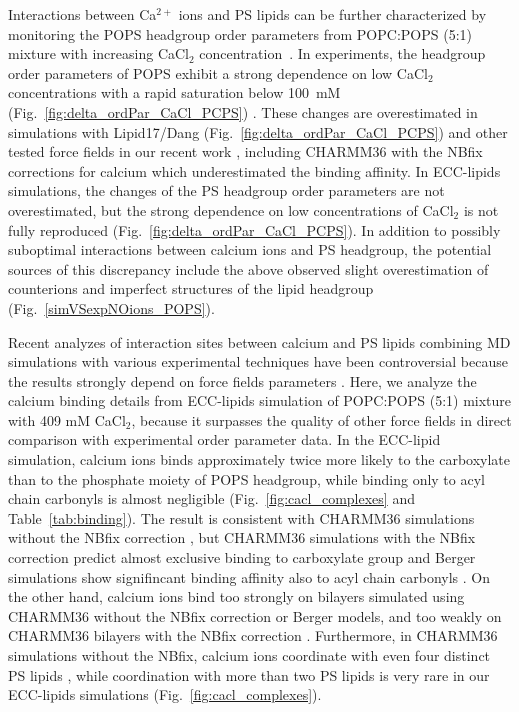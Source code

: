 \documentclass[journal=jctcce,manuscript=article]{achemso}
\begin{document}
Interactions between Ca$^{2+}$ ions and PS lipids can be further characterized by monitoring
the POPS headgroup order parameters from POPC:POPS (5:1) mixture with increasing  CaCl$_2$ concentration~\cite{roux90}.
In experiments, the headgroup order parameters of POPS exhibit a strong dependence
on low CaCl$_2$ concentrations with a rapid saturation below 100~mM  (Fig.~\ref{fig:delta_ordPar_CaCl_PCPS}) \cite{roux90}.
These changes are overestimated in simulations with Lipid17/Dang (Fig.~\ref{fig:delta_ordPar_CaCl_PCPS})
and other tested force fields in our recent work \cite{NMRlipidsIV}, 
including CHARMM36 with the NBfix corrections for calcium
which underestimated the binding affinity.
In ECC-lipids simulations, the changes of the PS headgroup order parameters are not overestimated,
but the strong dependence on low concentrations of CaCl$_2$ is not fully reproduced (Fig.~\ref{fig:delta_ordPar_CaCl_PCPS}).
In addition to possibly suboptimal interactions between calcium ions and PS headgroup, the potential sources of this
discrepancy include the above observed slight overestimation of  counterions and
imperfect structures of the lipid headgroup (Fig.~\ref{simVSexpNOions_POPS}).

Recent analyzes of interaction sites between calcium and PS lipids combining
MD simulations with various experimental techniques have been 
controversial because the results strongly depend on force fields parameters \cite{melcrova16,valentine18,hallock18}.
Here, we analyze the calcium binding details from ECC-lipids simulation of POPC:POPS (5:1) mixture with 409 mM CaCl$_2$,
because it surpasses the quality of other force fields in direct comparison with experimental order parameter data.
In the ECC-lipid simulation, calcium ions binds approximately twice more likely 
to the carboxylate than to the phosphate moiety of POPS headgroup,
while binding only to acyl chain carbonyls is almost negligible (Fig.~\ref{fig:cacl_complexes} and Table~\ref{tab:binding}).
The result is consistent with CHARMM36 simulations without the NBfix correction \cite{hallock18},
but CHARMM36 simulations with the NBfix correction \cite{kim16} predict almost exclusive binding to carboxylate group \cite{valentine18}
and Berger simulations show signifincant binding affinity also to acyl chain carbonyls \cite{melcrova16}.
On the other hand, calcium ions bind too strongly on bilayers simulated using CHARMM36 without the NBfix correction
or Berger models, and too weakly on CHARMM36 bilayers with the NBfix correction \cite{catte16,NMRlipidsIV}.
Furthermore, in CHARMM36 simulations without the NBfix,
calcium ions coordinate with even four distinct PS lipids \cite{hallock18}, while coordination with more than two PS lipids
is very rare in our ECC-lipids simulations (Fig.~\ref{fig:cacl_complexes}).
\end{document}
